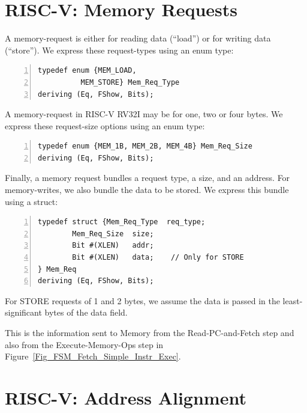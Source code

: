 
\section{RISC-V: Memory Requests}


A memory-request is either for reading data (``load'') or for writing
data (``store'').  We express these request-types using an enum type:

\begin{Verbatim}[frame=single, numbers=left]
typedef enum {MEM_LOAD,
	      MEM_STORE} Mem_Req_Type
deriving (Eq, FShow, Bits);
\end{Verbatim}

A memory-request in RISC-V RV32I may be for one, two or four bytes.
We express these request-size options using an enum type:

\begin{Verbatim}[frame=single, numbers=left]
typedef enum {MEM_1B, MEM_2B, MEM_4B} Mem_Req_Size
deriving (Eq, FShow, Bits);
\end{Verbatim}

Finally, a memory request bundles a request type, a size, and an
address.  For memory-writes, we also bundle the data to be stored.  We
express this bundle using a struct:

\begin{Verbatim}[frame=single, numbers=left]
typedef struct {Mem_Req_Type  req_type;
		Mem_Req_Size  size;
		Bit #(XLEN)   addr;
		Bit #(XLEN)   data;    // Only for STORE
} Mem_Req
deriving (Eq, FShow, Bits);
\end{Verbatim}

For STORE requests of 1 and 2 bytes, we assume the data is passed in
the least-significant bytes of the data field.

This is the information sent to Memory from the Read-PC-and-Fetch step
and also from the Execute-Memory-Ops step in
Figure~\ref{Fig_FSM_Fetch_Simple_Instr_Exec}.


\section{RISC-V: Address Alignment}


